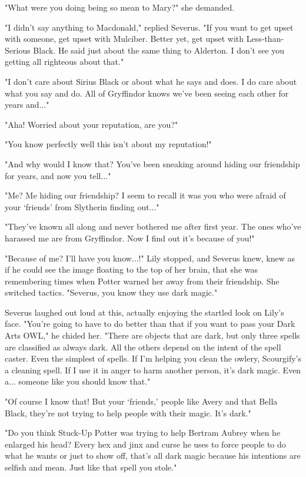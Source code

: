 \documentclass[a4paper,11pt]{article}
\begin{document}
"What were you doing being so mean to Mary?" she demanded.

"I didn't say anything to Macdonald," replied Severus. "If you want to get upset with someone, get upset with Mulciber. Better yet, get upset with Less-than-Serious Black. He said just about the same thing to Alderton. I don't see you getting all righteous about that."

"I don't care about Sirius Black or about what he says and does. I do care about what you say and do. All of Gryffindor knows we've been seeing each other for years and..."

"Aha! Worried about your reputation, are you?"

"You know perfectly well this isn't about my reputation!"

"And why would I know that? You've been sneaking around hiding our friendship for years, and now you tell..."

"Me? Me hiding our friendship? I seem to recall it was you who were afraid of your `friends' from Slytherin finding out..."

"They've known all along and never bothered me after first year. The ones who've harassed me are from Gryffindor. Now I find out it's because of you!"

"Because of me? I'll have you know...!" Lily stopped, and Severus knew, knew as if he could see the image floating to the top of her brain, that she was remembering times when Potter warned her away from their friendship. She switched tactics. "Severus, you know they use dark magic."

Severus laughed out loud at this, actually enjoying the startled look on Lily's face. "You're going to have to do better than that if you want to pass your Dark Arts OWL," he chided her. "There are objects that are dark, but only three spells are classified as always dark. All the others depend on the intent of the spell caster. Even the simplest of spells. If I'm helping you clean the owlery, Scourgify's a cleaning spell. If I use it in anger to harm another person, it's dark magic. Even a... someone like you should know that."

"Of course I know that! But your `friends,' people like Avery and that Bella Black, they're not trying to help people with their magic. It's dark."

"Do you think Stuck-Up Potter was trying to help Bertram Aubrey when he enlarged his head? Every hex and jinx and curse he uses to force people to do what he wants or just to show off, that's all dark magic because his intentions are selfish and mean. Just like that spell you stole."
\end{document}
